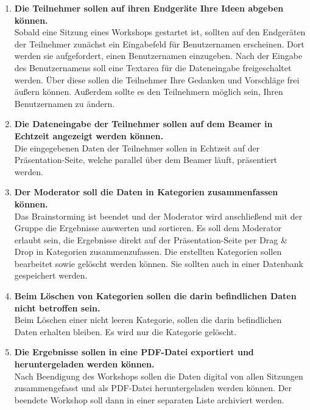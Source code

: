 \begin{enumerate}
Zu Beginn des Workshops sollte ein QR\footnote{englisch: Quick Response}-Code mittels Beamer angezeigt werden, sodass die anwesenden Teilnehmer diesen mit ihren Mobilgeräten einscannen und an diesem Workshop mitwirken können. Der Moderator sollte auch die Möglichkeit haben, auch während einer Sitzung den QR-Code einblenden zu können. Die Einladung zur Teilnahme am Workshop sollte ebenfalls auch per Mail gesendet werden können.
\item \textbf{Die Teilnehmer sollen auf ihren Endgeräte Ihre Ideen abgeben können.}\\
Sobald eine Sitzung eines Workshops gestartet ist, sollten auf den Endgeräten der Teilnehmer zunächst ein Eingabefeld für Benutzernamen erscheinen. Dort werden sie aufgefordert, einen Benutzernamen einzugeben. Nach der Eingabe des Benutzernamens soll eine Textarea für die Dateneingabe freigeschaltet werden. Über diese sollen die Teilnehmer Ihre Gedanken und Vorschläge frei äußern können. Außerdem sollte es den Teilnehmern möglich sein, Ihren Benutzernamen zu ändern.
\item \textbf{Die Dateneingabe der Teilnehmer sollen auf dem Beamer in Echtzeit angezeigt werden können.} \\
Die eingegebenen Daten der Teilnehmer sollen in Echtzeit auf der Präsentation-Seite, welche parallel über dem Beamer läuft, präsentiert werden.
\item \textbf{Der Moderator soll die Daten in Kategorien zusammenfassen können.}\\
Das Brainstorming ist beendet und der Moderator wird anschließend mit der Gruppe die Ergebnisse auswerten und sortieren. Es soll dem Moderator erlaubt sein, die Ergebnisse direkt auf der Präsentation-Seite per Drag \& Drop in Kategorien zusammenzufassen. Die erstellten Kategorien sollen bearbeitet sowie gelöscht werden können. Sie sollten auch in einer Datenbank gespeichert werden.
\item \textbf{Beim Löschen von Kategorien sollen die darin befindlichen Daten nicht betroffen sein.}\\
Beim Löschen einer nicht leeren Kategorie, sollen die darin befindlichen Daten erhalten bleiben. Es wird nur die Kategorie gelöscht.
\item \textbf{Die Ergebnisse sollen in eine PDF-Datei exportiert und heruntergeladen werden können.}\\
Nach Beendigung des Workshops sollen die Daten digital von allen Sitzungen zusammengefasst und als PDF-Datei heruntergeladen werden können. Der beendete Workshop soll dann in einer separaten Liste archiviert werden.
\end{enumerate}

